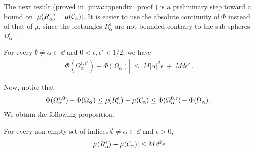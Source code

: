 The next result (proved in \ref{jmva:appendix_proof}) is a preliminary step toward a bound on $|\mu(R_\alpha^\epsilon)-\mu(\mathcal{C}_\alpha)|$. It is easier to use the absolute continuity of $\Phi$ instead of that of $\mu$, since the rectangles $R_\alpha^\epsilon$ are not bounded contrary to the sub-spheres $\Omega_\alpha^{\epsilon, \epsilon'}$. 
\begin{lemma}
\label{jmva:lemma_simplex}
For every $\emptyset \neq \alpha \subset \dd$ and $0 < \epsilon, \epsilon' < 1/2$, we have 
\begin{align*}
|\Phi(\Omega_\alpha^{\epsilon, \epsilon'}) - \Phi(\Omega_\alpha)| ~\le~ M |\alpha|^2 \epsilon ~+~ M d \epsilon'~.
\end{align*}
\end{lemma}
\noindent
 Now, notice that %
$$
\Phi(\Omega_\alpha^{\epsilon, 0}) - \Phi(\Omega_\alpha) \le \mu(R_\alpha^\epsilon) - \mu(\mathcal{C}_\alpha) \le \Phi(\Omega_\alpha^{0, \epsilon}) - \Phi(\Omega_\alpha).
$$
We obtain the following proposition.
\begin{proposition}
\label{jmva:prop_simplex}
For every non empty set of indices $\emptyset \neq \alpha \subset \dd$ and $\epsilon > 0$,
\begin{align*}
|\mu(R_\alpha^\epsilon)-\mu(\mathcal{C}_\alpha)| \le M d^2 \epsilon
\end{align*}
\end{proposition}

